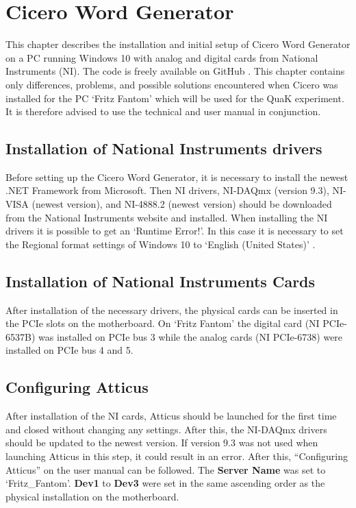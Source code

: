 
\chapter{Cicero Word Generator}\label{chap:Cicero, Cicero Word Generator}
This chapter describes the installation and initial setup of Cicero Word Generator \autocite{keshet2013distributed} on a PC running Windows 10 with analog and digital cards from National Instruments (NI). The code is freely available on GitHub \autocite{akeshet:Github}. This chapter contains only differences, problems, and possible solutions encountered when Cicero was installed for the PC `Fritz Fantom' which will be used for the QuaK experiment. It is therefore advised to use the technical and user manual \autocite{akeshet:manual} in conjunction.

\section{Installation of National Instruments drivers}\label{sec:Cicero, Installation of National Instruments drivers}
Before setting up the Cicero Word Generator, it is necessary to install the newest .NET Framework \autocite{microsoft:download.net} from Microsoft. Then NI drivers, NI-DAQmx (version 9.3), NI-VISA (newest version), and NI-4888.2 (newest version) should be downloaded from the National Instruments website \autocite{ni:drivers} and installed. When installing the NI drivers it is possible to get an `Runtime Error!'. In this case it is necessary to set the Regional format settings of Windows 10 to `English (United States)' \autocite{ni:runtimeerror}.

\section{Installation of National Instruments Cards}\label{sec:Cicero, Installation of National Instruments Cards}
After installation of the necessary drivers, the physical cards can be inserted in the PCIe slots on the motherboard. On `Fritz Fantom' the digital card (NI PCIe-6537B) was installed on PCIe bus 3 while the analog cards (NI PCIe-6738) were installed on PCIe bus 4 and 5.

\section{Configuring Atticus}\label{sec:Cicero, Configuring Atticus}
After installation of the NI cards, Atticus should be launched for the first time and closed without changing any settings. After this, the NI-DAQmx drivers should be updated to the newest version. If version 9.3 was not used when launching Atticus in this step, it could result in an error. After this, ``Configuring Atticus'' on the user manual can be followed. The \textbf{Server Name} was set to `Fritz\_Fantom'. \textbf{Dev1} to \textbf{Dev3} were set in the same ascending order as the physical installation on the motherboard.

